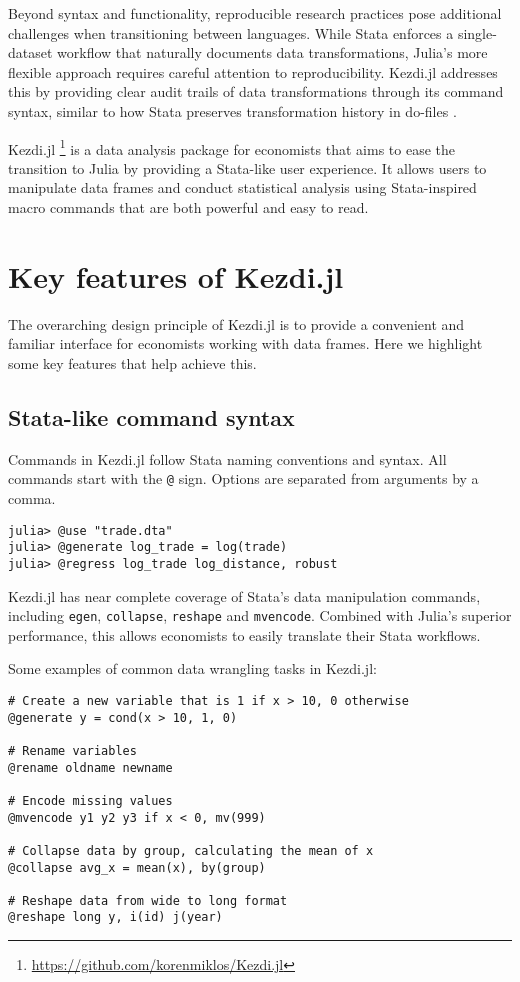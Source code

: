 \documentclass{juliacon}
\begin{document}
Beyond syntax and functionality, reproducible research practices pose additional challenges when transitioning between languages. While Stata enforces a single-dataset workflow that naturally documents data transformations, Julia's more flexible approach requires careful attention to reproducibility. Kezdi.jl addresses this by providing clear audit trails of data transformations through its command syntax, similar to how Stata preserves transformation history in do-files \cite{koren2024ten}.

Kezdi.jl \footnote{\url{https://github.com/korenmiklos/Kezdi.jl}} is a data analysis package for economists that aims to ease the transition to Julia by providing a Stata-like user experience. It allows users to manipulate data frames and conduct statistical analysis using Stata-inspired macro commands that are both powerful and easy to read.

\section{Key features of Kezdi.jl}

The overarching design principle of Kezdi.jl is to provide a convenient and familiar interface for economists working with data frames. Here we highlight some key features that help achieve this.

\subsection{Stata-like command syntax}

Commands in Kezdi.jl follow Stata naming conventions and syntax. All commands start with the \texttt{@} sign. Options are separated from arguments by a comma.

\begin{verbatim}
julia> @use "trade.dta"
julia> @generate log_trade = log(trade)
julia> @regress log_trade log_distance, robust
\end{verbatim}

Kezdi.jl has near complete coverage of Stata's data manipulation commands, including \texttt{egen}, \texttt{collapse}, \texttt{reshape} and \texttt{mvencode}. Combined with Julia's superior performance, this allows economists to easily translate their Stata workflows.

Some examples of common data wrangling tasks in Kezdi.jl:

\begin{verbatim}
# Create a new variable that is 1 if x > 10, 0 otherwise
@generate y = cond(x > 10, 1, 0)

# Rename variables
@rename oldname newname

# Encode missing values
@mvencode y1 y2 y3 if x < 0, mv(999)

# Collapse data by group, calculating the mean of x
@collapse avg_x = mean(x), by(group)

# Reshape data from wide to long format
@reshape long y, i(id) j(year)
\end{verbatim}
\end{document}
